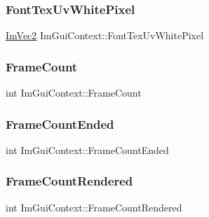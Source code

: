 \subsubsection{\texorpdfstring{Font\+Tex\+Uv\+White\+Pixel}{FontTexUvWhitePixel}}
{\footnotesize\ttfamily \hyperlink{struct_im_vec2}{Im\+Vec2} Im\+Gui\+Context\+::\+Font\+Tex\+Uv\+White\+Pixel}

\hypertarget{struct_im_gui_context_ab9a1f3b3f15f0a6c5f29aef85f1a8ea2}{}\label{struct_im_gui_context_ab9a1f3b3f15f0a6c5f29aef85f1a8ea2} 
\subsubsection{\texorpdfstring{Frame\+Count}{FrameCount}}
{\footnotesize\ttfamily int Im\+Gui\+Context\+::\+Frame\+Count}

\hypertarget{struct_im_gui_context_aa4cc3099c789be981d665c617b6d78a9}{}\label{struct_im_gui_context_aa4cc3099c789be981d665c617b6d78a9} 
\subsubsection{\texorpdfstring{Frame\+Count\+Ended}{FrameCountEnded}}
{\footnotesize\ttfamily int Im\+Gui\+Context\+::\+Frame\+Count\+Ended}

\hypertarget{struct_im_gui_context_a64a96ecd43f4b10c1fec8eb3fc9bff89}{}\label{struct_im_gui_context_a64a96ecd43f4b10c1fec8eb3fc9bff89} 
\subsubsection{\texorpdfstring{Frame\+Count\+Rendered}{FrameCountRendered}}
{\footnotesize\ttfamily int Im\+Gui\+Context\+::\+Frame\+Count\+Rendered}

\hypertarget{struct_im_gui_context_aca772ab262c0094e8bbe7eae215fc23b}{}\label{struct_im_gui_context_aca772ab262c0094e8bbe7eae215fc23b} 
